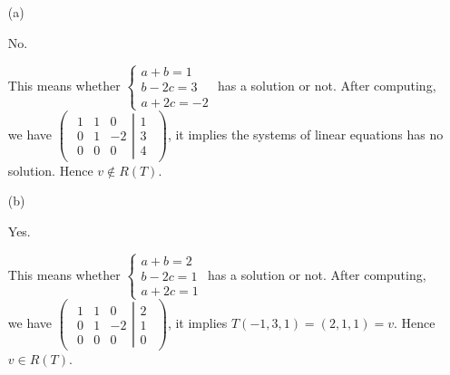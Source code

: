 \begin{Exercise}
	\begin{enumerate}[(a)]
		\item[(a)]
		\begin{answer}
			No.
		\end{answer}
		\begin{solution}
			This means whether $\begin{cases}
			a+b = 1 \\
			b-2c = 3 \\
			a+2c = -2
			\end{cases}$ has a solution or not. After computing, we have
			$\begin{pmatrix} \left.\begin{matrix}
			1 & 1 & 0 \\
			0 & 1 & -2 \\
			0 & 0 & 0
			\end{matrix} \right| \begin{matrix}
			1 \\
			3 \\
			4
			\end{matrix} \end{pmatrix}$, it implies the systems of linear equations has no solution. Hence $v\notin R(T)$.
		\end{solution}
		
		\item[(b)]
		\begin{answer}
			Yes.
		\end{answer}
		\begin{solution}
			This means whether $\begin{cases}
			a+b = 2\\
			b-2c = 1 \\
			a+2c = 1
			\end{cases}$ has a solution or not. After computing, we have $\begin{pmatrix} \left.\begin{matrix}
			1 & 1 & 0 \\
			0 & 1 & -2 \\
			0 & 0 & 0
			\end{matrix} \right| \begin{matrix}
			2 \\
			1 \\
			0
			\end{matrix} \end{pmatrix}$, it implies $T(-1,3,1) = (2,1,1) = v$. Hence $v\in R(T)$.
		\end{solution}
		
	\end{enumerate}
\end{Exercise}